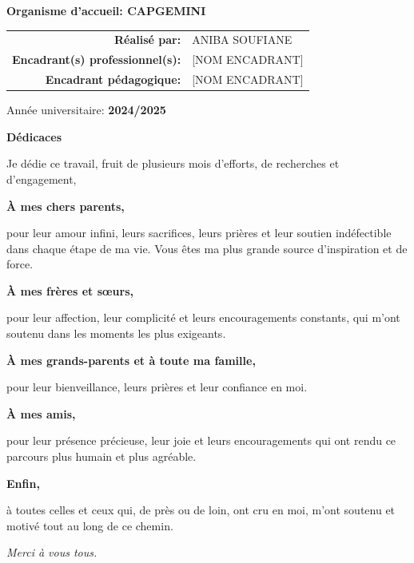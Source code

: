 \documentclass[12pt,a4paper]{report}
\begin{document}
\begin{center}
{\large \textbf{Organisme d'accueil: CAPGEMINI}}\\[1.5cm]

\begin{tabular}{@{}>{\bfseries}r l@{}}
  Réalisé par:& ANIBA SOUFIANE \\
  Encadrant(s) professionnel(s):& [NOM ENCADRANT] \\
  Encadrant pédagogique:& [NOM ENCADRANT] \\
\end{tabular}

\vfill
{\large Année universitaire: \textbf{2024/2025}}

\end{center}

\clearpage
\thispagestyle{empty}
\begin{center}
    {\Large\bfseries Dédicaces}\par
    \vspace{1.2cm}

    \begin{minipage}{0.85\linewidth}
    \centering
    Je dédie ce travail, fruit de plusieurs mois d'efforts, de recherches et d'engagement,\par
    \vspace{0.6em}

    \textbf{À mes chers parents,}\par
    pour leur amour infini, leurs sacrifices, leurs prières et leur soutien indéfectible
    dans chaque étape de ma vie. Vous êtes ma plus grande source d'inspiration et de force.\par
    \vspace{0.8em}

    \textbf{À mes frères et sœurs,}\par
    pour leur affection, leur complicité et leurs encouragements constants,
    qui m'ont soutenu dans les moments les plus exigeants.\par
    \vspace{0.8em}

    \textbf{À mes grands-parents et à toute ma famille,}\par
    pour leur bienveillance, leurs prières et leur confiance en moi.\par
    \vspace{0.8em}

    \textbf{À mes amis,}\par
    pour leur présence précieuse, leur joie et leurs encouragements qui ont rendu
    ce parcours plus humain et plus agréable.\par
    \vspace{0.8em}

    \textbf{Enfin,}\par
    à toutes celles et ceux qui, de près ou de loin, ont cru en moi,
    m'ont soutenu et motivé tout au long de ce chemin.\par
    \vspace{1.2em}

    \emph{Merci à vous tous.}
    \end{minipage}
\end{center}
\end{document}
